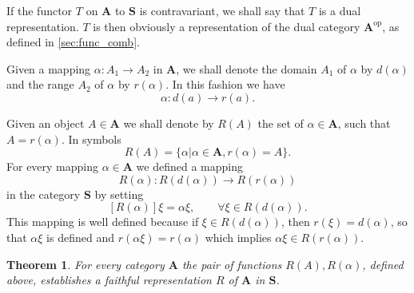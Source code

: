 \documentclass[11pt,a4paper]{report}
\newtheorem{theorem}{Theorem}
\begin{document}
If the functor $T$ on $\mathbf{A}$ to $\mathbf{S}$ is contravariant, we shall say that $T$ is a dual representation.
$T$ is then obviously a representation of the dual category $\mathbf{A}^\text{op}$, as defined in \cref{sec:func_comb}.

Given a mapping $\alpha:A_1\rightarrow A_2$ in $\mathbf{A}$, we shall denote the domain $A_1$ of $\alpha$ by $d(\alpha)$
and the range $A_2$ of $\alpha$ by $r(\alpha)$. In this fashion we have
\begin{equation*}
	\alpha:d(a)\rightarrow r(a).
\end{equation*}

Given an object $A\in\mathbf{A}$ we shall denote by $R(A)$ the set of $\alpha\in\mathbf{A}$, such that $A=r(\alpha)$.
In symbols
\begin{equation}\label{eq:rep_dom}
	R(A)= \{\alpha | \alpha\in\mathbf{A}, r(\alpha)=A\}.
\end{equation}
For every mapping $\alpha\in\mathbf{A}$ we defined a mapping
\begin{equation}\label{eq:rep_map}
	R(\alpha):R(d(\alpha))\rightarrow R(r(\alpha))
\end{equation}
in the category $\mathbf{S}$ by setting
\begin{equation}\label{eq:rep_nat}
	[R(\alpha)]\xi=\alpha\xi,\qquad \forall\xi\in R(d(\alpha)).
\end{equation}
This mapping is well defined because if $\xi\in R(d(\alpha))$, then $r(\xi)=d(\alpha)$, so that $\alpha\xi$ is defined
and $r(\alpha\xi)=r(\alpha)$ which implies $\alpha\xi\in R(r(\alpha))$.
\begin{theorem}
	For every category $\mathbf{A}$ the pair of functions $R(A),R(\alpha)$, defined above, establishes a faithful
	representation $R$ of $\mathbf{A}$ in $\mathbf{S}$.
\end{theorem}
\end{document}
